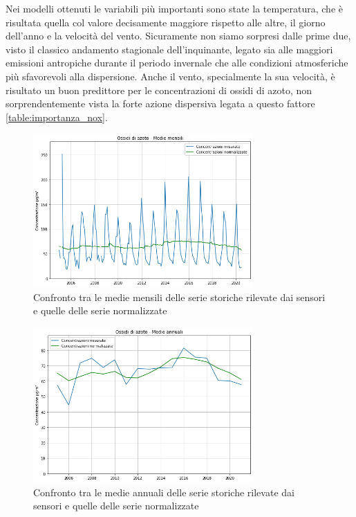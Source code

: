 Nei modelli ottenuti le variabili più importanti sono state la temperatura, che è risultata quella col valore decisamente maggiore rispetto alle altre, il giorno dell'anno e la velocità del vento. Sicuramente non siamo sorpresi dalle prime due, visto il classico andamento stagionale dell'inquinante, legato sia alle maggiori emissioni antropiche durante il periodo invernale che alle condizioni atmosferiche più sfavorevoli alla dispersione. Anche il vento, specialmente la sua velocità, è risultato un buon predittore per le concentrazioni di ossidi di azoto, non sorprendentemente vista la forte azione dispersiva legata a questo fattore \ref{table:importanza_nox}.

\begin{figure}[h]
\centering
\includegraphics[width=0.75\textwidth]{nox_medie_mensili}
\caption{Confronto tra le medie mensili delle serie storiche rilevate dai sensori e quelle delle serie normalizzate}
\label{fig:nox_medie_mensili}
\end{figure}

\begin{figure}[h]
\centering
\includegraphics[width=0.75\textwidth]{nox_medie_annuali}
\caption{Confronto tra le medie annuali delle serie storiche rilevate dai sensori e quelle delle serie normalizzate}
\label{fig:nox_medie_annuali}
\end{figure}


